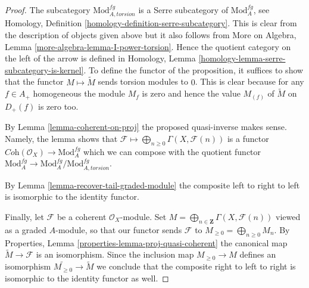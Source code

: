 \begin{proof}
The subcategory $\text{Mod}^{fg}_{A, torsion}$ is a Serre subcategory
of $\text{Mod}^{fg}_A$, see
Homology, Definition \ref{homology-definition-serre-subcategory}.
This is clear from the description of objects given above but it also follows
from More on Algebra, Lemma \ref{more-algebra-lemma-I-power-torsion}.
Hence the quotient category on the left of the arrow is defined
in Homology, Lemma \ref{homology-lemma-serre-subcategory-is-kernel}.
To define the functor of the proposition, it suffices to show that
the functor $M \mapsto \widetilde M$ sends torsion modules to $0$.
This is clear because for any $f \in A_+$ homogeneous the
module $M_f$ is zero and hence the value $M_{(f)}$ of $\widetilde M$
on $D_+(f)$ is zero too.

\medskip\noindent
By Lemma \ref{lemma-coherent-on-proj} the proposed quasi-inverse
makes sense. Namely, the lemma shows that
$\mathcal{F} \longmapsto \bigoplus_{n \geq 0} \Gamma(X, \mathcal{F}(n))$
is a functor $\textit{Coh}(\mathcal{O}_X) \to \text{Mod}^{fg}_A$
which we can compose with the quotient functor
$\text{Mod}^{fg}_A \to \text{Mod}^{fg}_A/\text{Mod}^{fg}_{A, torsion}$.

\medskip\noindent
By Lemma \ref{lemma-recover-tail-graded-module}
the composite left to right to left is isomorphic to the identity functor.

\medskip\noindent
Finally, let $\mathcal{F}$ be a coherent $\mathcal{O}_X$-module.
Set $M = \bigoplus_{n \in \mathbf{Z}} \Gamma(X, \mathcal{F}(n))$
viewed as a graded $A$-module, so that our functor sends $\mathcal{F}$ to
$M_{\geq 0} = \bigoplus_{n \geq 0} M_n$.
By Properties, Lemma \ref{properties-lemma-proj-quasi-coherent}
the canonical map $\widetilde M \to \mathcal{F}$
is an isomorphism. Since the inclusion map
$M_{\geq 0} \to M$ defines an isomorphism
$\widetilde{M_{\geq 0}} \to \widetilde M$ we conclude that
the composite right to left to right is isomorphic to the identity
functor as well.
\end{proof}





